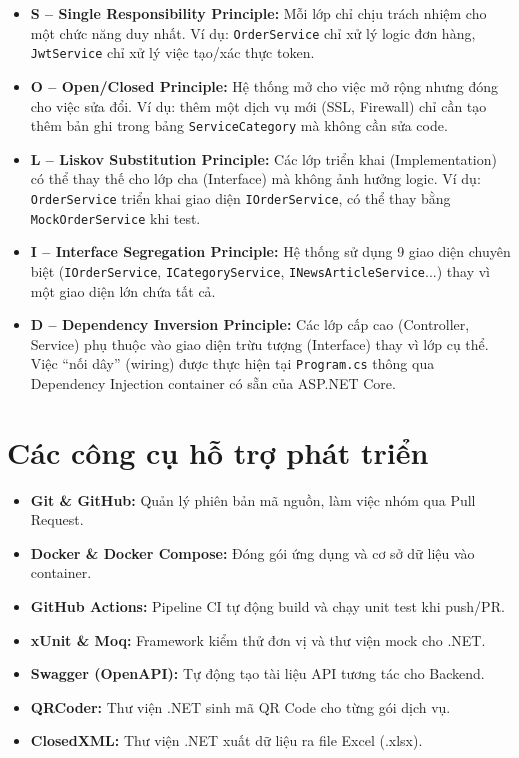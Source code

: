 \begin{itemize}
    \item \textbf{S -- Single Responsibility Principle:} Mỗi lớp chỉ chịu trách nhiệm cho một chức năng duy nhất. Ví dụ: \texttt{OrderService} chỉ xử lý logic đơn hàng, \texttt{JwtService} chỉ xử lý việc tạo/xác thực token.
    \item \textbf{O -- Open/Closed Principle:} Hệ thống mở cho việc mở rộng nhưng đóng cho việc sửa đổi. Ví dụ: thêm một dịch vụ mới (SSL, Firewall) chỉ cần tạo thêm bản ghi trong bảng \texttt{ServiceCategory} mà không cần sửa code.
    \item \textbf{L -- Liskov Substitution Principle:} Các lớp triển khai (Implementation) có thể thay thế cho lớp cha (Interface) mà không ảnh hưởng logic. Ví dụ: \texttt{OrderService} triển khai giao diện \texttt{IOrderService}, có thể thay bằng \texttt{MockOrderService} khi test.
    \item \textbf{I -- Interface Segregation Principle:} Hệ thống sử dụng 9 giao diện chuyên biệt (\texttt{IOrderService}, \texttt{ICategoryService}, \texttt{INewsArticleService}...) thay vì một giao diện lớn chứa tất cả.
    \item \textbf{D -- Dependency Inversion Principle:} Các lớp cấp cao (Controller, Service) phụ thuộc vào giao diện trừu tượng (Interface) thay vì lớp cụ thể. Việc ``nối dây'' (wiring) được thực hiện tại \texttt{Program.cs} thông qua Dependency Injection container có sẵn của ASP.NET Core.
\end{itemize}

\section{Các công cụ hỗ trợ phát triển}
\begin{itemize}
    \item \textbf{Git \& GitHub:} Quản lý phiên bản mã nguồn, làm việc nhóm qua Pull Request.
    \item \textbf{Docker \& Docker Compose:} Đóng gói ứng dụng và cơ sở dữ liệu vào container.
    \item \textbf{GitHub Actions:} Pipeline CI tự động build và chạy unit test khi push/PR.
    \item \textbf{xUnit \& Moq:} Framework kiểm thử đơn vị và thư viện mock cho .NET.
    \item \textbf{Swagger (OpenAPI):} Tự động tạo tài liệu API tương tác cho Backend.
    \item \textbf{QRCoder:} Thư viện .NET sinh mã QR Code cho từng gói dịch vụ.
    \item \textbf{ClosedXML:} Thư viện .NET xuất dữ liệu ra file Excel (.xlsx).
\end{itemize}
